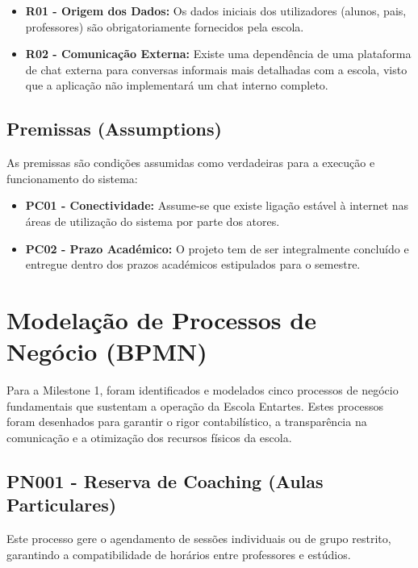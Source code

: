 \documentclass[12pt,a4paper]{report}
\begin{document}
\begin{itemize}
    \item \textbf{R01 - Origem dos Dados:} Os dados iniciais dos utilizadores (alunos, pais, professores) são obrigatoriamente fornecidos pela escola.
    \item \textbf{R02 - Comunicação Externa:} Existe uma dependência de uma plataforma de chat externa para conversas informais mais detalhadas com a escola, visto que a aplicação não implementará um chat interno completo.
\end{itemize}

\section{Premissas (Assumptions)}
As premissas são condições assumidas como verdadeiras para a execução e funcionamento do sistema:

\begin{itemize}
    \item \textbf{PC01 - Conectividade:} Assume-se que existe ligação estável à internet nas áreas de utilização do sistema por parte dos atores.
    \item \textbf{PC02 - Prazo Académico:} O projeto tem de ser integralmente concluído e entregue dentro dos prazos académicos estipulados para o semestre.
\end{itemize}

\chapter{Modelação de Processos de Negócio (BPMN)}

Para a Milestone 1, foram identificados e modelados cinco processos de negócio fundamentais que sustentam a operação da Escola Entartes. Estes processos foram desenhados para garantir o rigor contabilístico, a transparência na comunicação e a otimização dos recursos físicos da escola.

\section{PN001 - Reserva de Coaching (Aulas Particulares)}
Este processo gere o agendamento de sessões individuais ou de grupo restrito, garantindo a compatibilidade de horários entre professores e estúdios.
\end{document}
